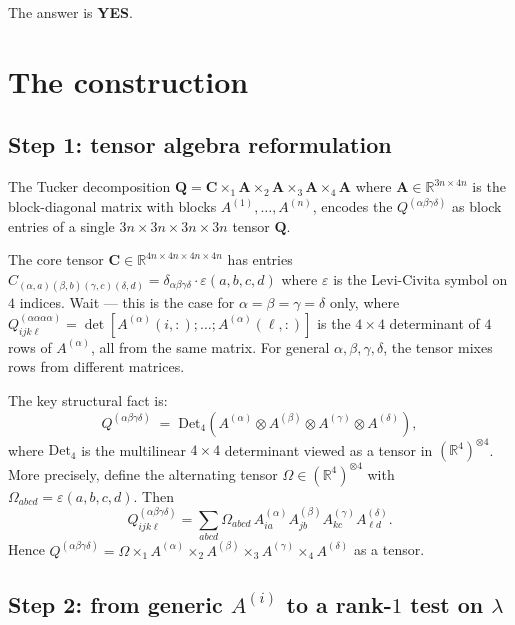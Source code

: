 \medskip
\noindent The answer is \textbf{YES}.

\section*{The construction}

\subsection*{Step 1: tensor algebra reformulation}

The Tucker decomposition $\mathbf Q=\mathbf C\times_1\mathbf A\times_2\mathbf A\times_3\mathbf A\times_4\mathbf A$ where $\mathbf A\in\mathbb R^{3n\times 4n}$ is the block-diagonal matrix with blocks $A^{(1)},\ldots,A^{(n)}$, encodes the $Q^{(\alpha\beta\gamma\delta)}$ as block entries of a single $3n\times 3n\times 3n\times 3n$ tensor $\mathbf Q$.

The core tensor $\mathbf C\in\mathbb R^{4n\times 4n\times 4n\times 4n}$ has entries $C_{(\alpha,a)(\beta,b)(\gamma,c)(\delta,d)} = \delta_{\alpha\beta\gamma\delta}\cdot \varepsilon(a,b,c,d)$ where $\varepsilon$ is the Levi-Civita symbol on $4$ indices.  Wait — this is the case for $\alpha=\beta=\gamma=\delta$ only, where $Q^{(\alpha\alpha\alpha\alpha)}_{ijk\ell}=\det[A^{(\alpha)}(i,:);\ldots;A^{(\alpha)}(\ell,:)]$ is the $4\times 4$ determinant of $4$ rows of $A^{(\alpha)}$, all from the same matrix.  For general $\alpha,\beta,\gamma,\delta$, the tensor mixes rows from different matrices.

\medskip
The key structural fact is:
\begin{equation}\label{eq:multilinearity}
Q^{(\alpha\beta\gamma\delta)} \;=\; \mathrm{Det}_4(A^{(\alpha)}\otimes A^{(\beta)}\otimes A^{(\gamma)}\otimes A^{(\delta)}),
\end{equation}
where $\mathrm{Det}_4$ is the multilinear $4\times 4$ determinant viewed as a tensor in $(\mathbb R^4)^{\otimes 4}$.  More precisely, define the alternating tensor $\Omega\in(\mathbb R^4)^{\otimes 4}$ with $\Omega_{abcd}=\varepsilon(a,b,c,d)$.  Then
\[
Q^{(\alpha\beta\gamma\delta)}_{ijk\ell} = \sum_{abcd}\Omega_{abcd}\,A^{(\alpha)}_{ia}A^{(\beta)}_{jb}A^{(\gamma)}_{kc}A^{(\delta)}_{\ell d}.
\]
Hence $Q^{(\alpha\beta\gamma\delta)}=\Omega\times_1 A^{(\alpha)}\times_2 A^{(\beta)}\times_3 A^{(\gamma)}\times_4 A^{(\delta)}$ as a tensor.

\subsection*{Step 2: from generic $A^{(i)}$ to a rank-$1$ test on $\lambda$}

